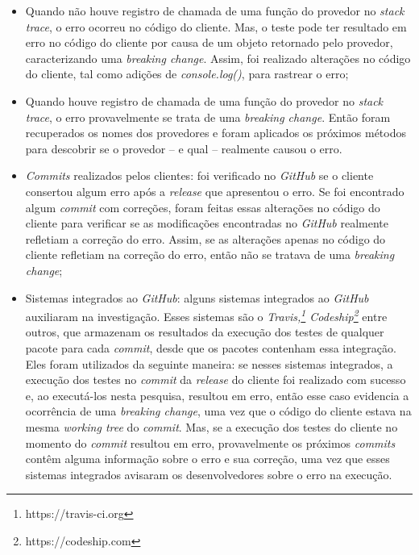 \begin{itemize}
    \item Quando não houve registro de chamada de uma função do provedor no \textit{stack trace}, o erro ocorreu no código do cliente. Mas, o teste pode ter resultado em erro no código do cliente por causa de um objeto retornado pelo provedor, caracterizando uma \textit{breaking change}. Assim, foi realizado alterações no código do cliente, tal como adições de \textit{console.log()}, para rastrear o erro;
    \item Quando houve registro de chamada de uma função do provedor no \textit{stack trace}, o erro provavelmente se trata de uma \textit{breaking change}. Então foram recuperados os nomes dos provedores e foram aplicados os próximos métodos para descobrir se o provedor -- e qual -- realmente causou o erro.

    \item \textit{Commits} realizados pelos clientes: foi verificado no \textit{GitHub} se o cliente consertou algum erro após a \textit{release} que apresentou o erro. Se foi encontrado algum \textit{commit} com correções, foram feitas essas alterações no código do cliente para verificar se as modificações encontradas no \textit{GitHub} realmente refletiam a correção do erro. Assim, se as alterações apenas no código do cliente refletiam na correção do erro, então não se tratava de uma \textit{breaking change};

    \item Sistemas integrados ao \textit{GitHub}: alguns sistemas integrados ao \textit{GitHub} auxiliaram na investigação. Esses sistemas são o \textit{Travis,\footnote{https://travis-ci.org} Codeship\footnote{https://codeship.com}} entre outros, que armazenam os resultados da execução dos testes de qualquer pacote para cada \textit{commit}, desde que os pacotes contenham essa integração. Eles foram utilizados da seguinte maneira: se nesses sistemas integrados, a execução dos testes no \textit{commit} da \textit{release} do cliente foi realizado com sucesso e, ao executá-los nesta pesquisa, resultou em erro, então esse caso evidencia a ocorrência de uma \textit{breaking change}, uma vez que o código do cliente estava na mesma \textit{working tree} do \textit{commit}. Mas, se a execução dos testes do cliente no momento do \textit{commit} resultou em erro, provavelmente os próximos \textit{commits} contêm alguma informação sobre o erro e sua correção, uma vez que esses sistemas integrados avisaram os desenvolvedores sobre o erro na execução.
    

\end{itemize}
